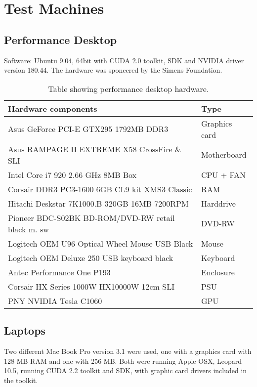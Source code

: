 
\chapter{Test Machines}
\label{chapter:test_machines}

\section{Performance Desktop}
\label{sec:test-machine-desktop}
Software: Ubuntu 9.04, 64bit with CUDA 2.0 toolkit, SDK and NVIDIA
driver version 180.44.
%
The hardware was sponcered by the Simens Foundation.

\begin{table}[h]
\centering
\begin{tabular}{ l l }
Hardware components                                & Type             \\
\hline
Asus GeForce PCI-E GTX295 1792MB DDR3              & Graphics card    \\
Asus RAMPAGE II EXTREME X58 CrossFire \& SLI       & Motherboard      \\
Intel Core i7 920 2.66 GHz 8MB Box                 & CPU + FAN        \\
Corsair DDR3 PC3-1600 6GB CL9 kit XMS3 Classic     & RAM              \\
Hitachi Deskstar 7K1000.B 320GB 16MB 7200RPM       & Harddrive        \\
Pioneer BDC-S02BK BD-ROM/DVD-RW retail black m. sw & DVD-RW           \\
Logitech OEM U96 Optical Wheel Mouse USB Black     & Mouse            \\
Logitech OEM Deluxe 250 USB keyboard black         & Keyboard         \\
Antec Performance One P193                         & Enclosure        \\
Corsair HX Series 1000W HX10000W 12cm SLI          & PSU              \\
PNY NVIDIA Tesla C1060                             & GPU              \\
\hline
\end{tabular}
\caption{Table showing performance desktop hardware.}
\label{tab:desktop-hardware}
\end{table}

\section{Laptops}
\label{sec:test-machines-latop}
Two different Mac Book Pro version 3.1 were used, one with a graphics
card with 128 MB RAM and one with 256 MB. Both were running Apple OSX,
Leopard 10.5, running CUDA 2.2 toolkit and SDK, with graphic card
drivers included in the toolkit.


